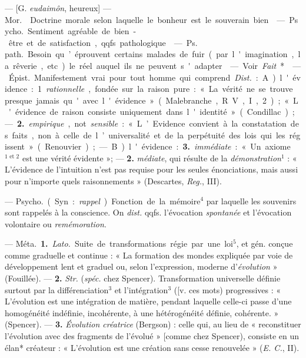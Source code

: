 \begin{itemize}[leftmargin=1cm, label=, itemsep=1pt]
 — [G. {\it eudaimôn}, heureux] — \si{Mor.} 
Doctrine morale selon laquelle le bonheur est le souverain bien.

 — \si{Psycho.} Sentiment
agréable de bien-être et de satisfaction, qqfs. pathologique.

 — \si{Ps. path.} Besoin qu’éprouvent certains malades de
fuir (par l'imagination, la rêverie, etc.) le
réel auquel ils ne peuvent s'adapter.

 — Voir {\it Fait}*.

 — \si{Épist.} Manifestement vrai pour tout homme qui
comprend. {\it Dist.} : A) l'évidence :
1. {\it rationnelle}, fondée sur la raison
pure : « La vérité ne se trouve
presque jamais qu'avec l'évidence »
(Malebranche, R. V., I, 2); « L'évidence de raison consiste uniquement dans
l'identité » (Condillac) ; — {\bf 2.} {\it empirique}, not. {\it sensible} :
 « L’Evidence convient à la constatation des
faits, non à celle de l’universalité
et de la perpétuité des lois qui les régissent » (Renouvier);

— B) l'évidence : {\bf 3.} {\it immédiate} : « Un axiome$^\text{1 et 2}$
est une vérité évidente »; — {\bf 2.} {\it médiate}, qui résulte de
la {\it démonstration}$^1$ : « L'évidence de
l'intuition n’est pas requise pour les
seules énonciations, mais aussi pour
n'importe quels raisonnements »
(Descartes, {\it Reg.}, III).

 — \si{Psycho.} (Syn. : {\it rappel}).
Fonction de la mémoire$^4$ par laquelle
les souvenirs sont rappelés à la conscience. On {\it dist.} qqfs. l'évocation
{\it spontanée} et l’évocation volontaire
ou {\it remémoration}.

 — \si{Méta.} {\bf 1.} {\it Lato.} Suite de
transformations régie par une loi$^5$,
et gén. conçue comme graduelle et
continue : « La formation des mondes
expliquée par voie de développement lent et graduel ou, selon
l'expression, moderne d'{\it évolution} »
(Fouillée). — {\bf 2.} {\it Str.} ({\it spéc.} chez
Spencer). Transformation universelle définie surtout par la différenciation$^3$ et l'intégration$^3$ ([v. ces
mots) progressives : « L’évolution
est une intégration de matière, pendant laquelle celle-ci passe d’une
homogénéité indéfinie, incohérente,
à une hétérogénéité définie, cohérente. » (Spencer). — {\bf 3.}
{\it Évolution créatrice} (Bergson) : celle qui, au
lieu de « reconstituer l’évolution
avec des fragments de l’évolué »
[comme chez Spencer), consiste en
un élan* créateur : « L'évolution
est une création sans cesse renouvelée » ({\it E. C.}, II).


\end{itemize}
